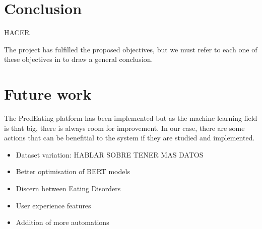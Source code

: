\section{Conclusion}
\label{sec:conclusion}

HACER

The project has fulfilled the proposed objectives, but we must refer 
to each one of these objectives in to draw a general conclusion.

\section{Future work}
The PredEating platform has been implemented but as the machine learning field is that big, there is always room for improvement. In our case, there are some actions that can be benefitial to the system if they are studied and implemented.
\begin{itemize}
    \item Dataset variation: HABLAR SOBRE TENER MAS DATOS
    \item Better optimisation of BERT models
    \item Discern between Eating Disorders
    \item User experience features
    \item Addition of more automations
\end{itemize}

